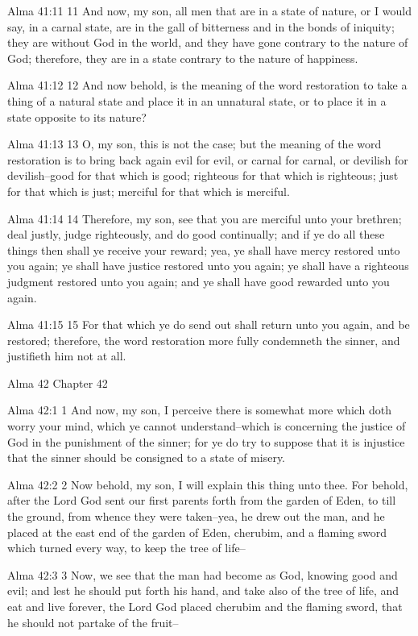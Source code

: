 Alma 41:11
 11 And now, my son, all men that are in a state of nature, or I
would say, in a carnal state, are in the gall of bitterness and
in the bonds of iniquity; they are without God in the world, and
they have gone contrary to the nature of God; therefore, they are
in a state contrary to the nature of happiness.

Alma 41:12
 12 And now behold, is the meaning of the word restoration to
take a thing of a natural state and place it in an unnatural
state, or to place it in a state opposite to its nature?

Alma 41:13
 13 O, my son, this is not the case; but the meaning of the word
restoration is to bring back again evil for evil, or carnal for
carnal, or devilish for devilish--good for that which is good;
righteous for that which is righteous; just for that which is
just; merciful for that which is merciful.

Alma 41:14
 14 Therefore, my son, see that you are merciful unto your
brethren; deal justly, judge righteously, and do good
continually; and if ye do all these things then shall ye receive
your reward; yea, ye shall have mercy restored unto you again; ye
shall have justice restored unto you again; ye shall have a
righteous judgment restored unto you again; and ye shall have
good rewarded unto you again.

Alma 41:15
 15 For that which ye do send out shall return unto you again,
and be restored; therefore, the word restoration more fully
condemneth the sinner, and justifieth him not at all.

Alma 42
Chapter 42

Alma 42:1
 1 And now, my son, I perceive there is somewhat more which doth
worry your mind, which ye cannot understand--which is concerning
the justice of God in the punishment of the sinner; for ye do try
to suppose that it is injustice that the sinner should be
consigned to a state of misery.

Alma 42:2
 2 Now behold, my son, I will explain this thing unto thee. For
behold, after the Lord God sent our first parents forth from the
garden of Eden, to till the ground, from whence they were
taken--yea, he drew out the man, and he placed at the east end of
the garden of Eden, cherubim, and a flaming sword which turned
every way, to keep the tree of life--

Alma 42:3
 3 Now, we see that the man had become as God, knowing good and
evil; and lest he should put forth his hand, and take also of the
tree of life, and eat and live forever, the Lord God placed
cherubim and the flaming sword, that he should not partake of the
fruit--

